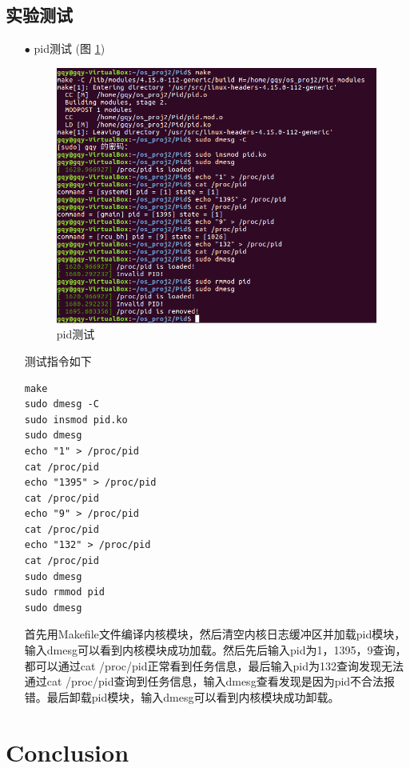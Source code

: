 \documentclass{article}
\begin{document}
\subsection{实验测试}
\begin{itemize}
\item[$\bullet$]pid测试 (图 \ref{pid测试})\\
\begin{figure}[htbp]%
		\centering%
		\includegraphics{pid}
		\caption{pid测试} \label{pid测试}%
\end{figure}
测试指令如下
\begin{lstlisting}[language={[ANSI]C}]
make
sudo dmesg -C
sudo insmod pid.ko
sudo dmesg
echo "1" > /proc/pid
cat /proc/pid
echo "1395" > /proc/pid
cat /proc/pid
echo "9" > /proc/pid
cat /proc/pid
echo "132" > /proc/pid
cat /proc/pid
sudo dmesg
sudo rmmod pid
sudo dmesg
\end{lstlisting}
首先用Makefile文件编译内核模块，然后清空内核日志缓冲区并加载pid模块，输入dmesg可以看到内核模块成功加载。然后先后输入pid为1，1395，9查询，都可以通过cat /proc/pid正常看到任务信息，最后输入pid为132查询发现无法通过cat /proc/pid查询到任务信息，输入dmesg查看发现是因为pid不合法报错。最后卸载pid模块，输入dmesg可以看到内核模块成功卸载。
\end{itemize}

\section{Conclusion}
\end{document}

